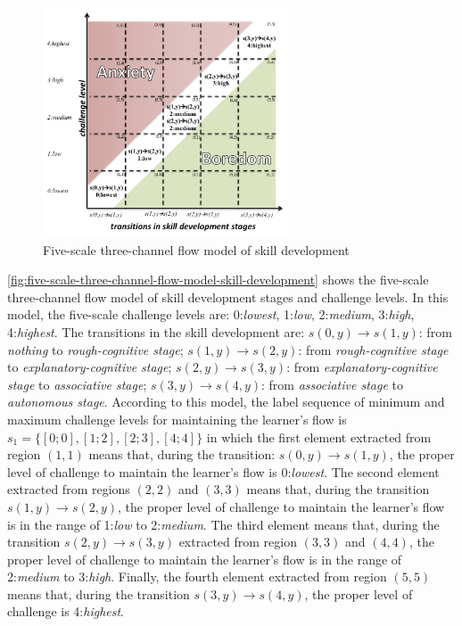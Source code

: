 \begin{figure}[htb]
 \caption{Five-scale three-channel flow model of skill development}
 \label{fig:five-scale-three-channel-flow-model-skill-development}
 \centering
 \includegraphics[width=0.65\textwidth]{images/chap-model-gmif/five-scale-three-channel-flow-model-skill-development.png}
 \fautor
\end{figure}

\autoref{fig:five-scale-three-channel-flow-model-skill-development} shows the five-scale three-channel flow model of skill development stages and challenge levels. In this model, the five-scale challenge levels are: 0:\emph{lowest}, 1:\emph{low}, 2:\emph{medium}, 3:\emph{high}, 4:\emph{highest}. The transitions in the skill development are: $s(0,y) \to s(1,y)$: from \emph{nothing} to \emph{rough-cognitive stage}; $s(1,y) \to s(2,y)$: from \emph{rough-cognitive stage} to \emph{explanatory-cognitive stage}; $s(2,y) \to s(3,y)$: from \emph{explanatory-cognitive stage} to \emph{associative stage}; $s(3,y) \to s(4,y)$: from \emph{associative stage} to \emph{autonomous stage}. According to this model, the label sequence of minimum and maximum challenge levels for maintaining the learner’s flow is $s_{1}=\{[0;0], [1;2], [2;3], [4;4]\}$ in which the first element \aspas{$[0;0]$} extracted from region $(1,1)$ means that, during the transition: $s(0,y) \to s(1,y)$, the proper level of challenge to maintain the learner’s flow is 0:\emph{lowest}. The second element \aspas{$[1;2]$} extracted from regions $(2,2)$ and $(3,3)$ means that, during the transition $s(1,y) \to s(2,y)$, the proper level of challenge to maintain the learner’s flow is in the range of 1:\emph{low} to 2:\emph{medium}. The third element \aspas{$[2;3]$} means that, during the transition $s(2,y) \to s(3,y)$ extracted from region $(3,3)$ and $(4,4)$, the proper level of challenge to maintain the learner’s flow is in the range of 2:\emph{medium} to 3:\emph{high}. Finally, the fourth element \aspas{$[4;4]$} extracted from region $(5,5)$ means that, during the transition $s(3,y) \to s(4,y)$, the proper level of challenge is 4:\emph{highest}.
 
